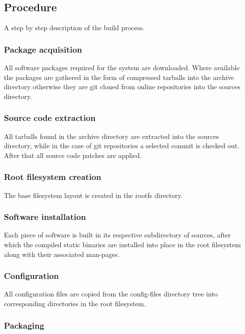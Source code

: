 \subsection{Procedure}

A step by step description of the build process.

\subsubsection{Package acquisition}

All software packages required for the system are downloaded. Where available the packages are gathered in the form of compressed tarballs into the archive directory otherwise they are git cloned from online repositories into the sources directory.

\subsubsection{Source code extraction}

All tarballs found in the archive directory are extracted into the sources directory, while in the case of git repositories a selected commit is checked out. After that all source code patches are applied.

\subsubsection{Root filesystem creation}

The base  filesystem layout is created in the rootfs directory.

\subsubsection{Software installation}

Each piece of software is built in its respective subdirectory of sources, after which the compiled static binaries are installed into place in the root filesystem along with their associated man-pages.

\subsubsection{Configuration}

All configuration files are copied from the config-files directory tree into corresponding directories in the root filesystem.

\subsubsection{Packaging}

